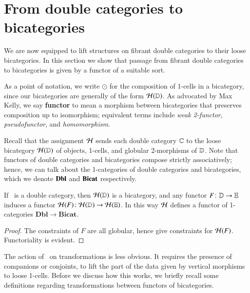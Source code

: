 \section{From double categories to bicategories}
\label{sec:1x1-to-bicat}

We are now equipped to lift structures on fibrant double categories to
their loose bicategories.  In this section we show that passage
from fibrant double categories to bicategories is given by a functor of a suitable sort.

As a point of notation, we write $\odot$ for the composition of
1-cells in a bicategory, since our bicategories are generally of the
form $\mathcal{H}(\mathbb{D})$.  As advocated by Max Kelly, we say \textbf{functor}
to mean a morphism between bicategories that preserves composition up
to isomorphism; equivalent terms include \emph{weak 2-functor},
\emph{pseudofunctor}, and \emph{homomorphism}.

Recall that the assignment $\mathcal{H}$ sends each double category $\mathbb{C}$ to the loose bicategory  $\mathcal{H}(\mathbb{D})$ of objects, 1-cells, and globular 2-morphisms of $\mathbb{D}$.  Note that functors of double categories and bicategories compose strictly associatively; hence, we can talk about the 1-categories of double categories and bicategories, which we denote ${\bf Dbl}$ and ${\bf Bicat}$ respectively.

\begin{thm}\label{thm:1-func}
 If \lD\ is a double category, then $\mathcal{H}(\mathbb{D})$ is a bicategory, and
  any functor $F\colon \mathbb{D}\to\mathbb{E}$ induces a functor $\mathcal{H}(F)\colon
  \mathcal{H}(\mathbb{D})\to\mathcal{H}(\mathbb{E})$.  In this way $\mathcal{H}$ defines a functor of
  1-categories $\mathbf{Dbl}\to \mathbf{Bicat}$.
\end{thm}
\begin{proof}
 The constraints of $F$ are all globular, hence give constraints for
  $\mathcal{H}(F)$.  Functoriality is evident.
\end{proof}

The action of \cH\ on transformations is less obvious. It
requires the presence of companions or conjoints, to lift the part of the data given by vertical morphisms to loose 1-cells. Before we discuss how this works, we briefly recall some definitions regarding transformations between functors of bicategories.

